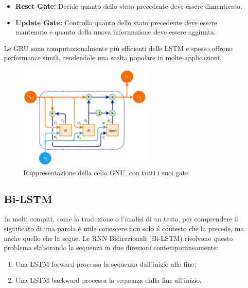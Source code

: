 \begin{itemize}
    \item \textbf{Reset Gate:} Decide quanto dello stato precedente deve essere dimenticato;
    \item \textbf{Update Gate:} Controlla quanto dello stato precedente deve essere mantenuto e quanto della nuova informazione deve essere aggiunta.
\end{itemize}
Le GRU sono computazionalmente più efficienti delle LSTM e spesso offrono performance simili, rendendole una scelta popolare in molte applicazioni.

\begin{figure}[hbtp]
    \centering
    \includegraphics[width=0.60\textwidth]{figure/GNU.png}
    \caption{Rappresentazione della cella GNU, con tutti i suoi gate}
    \label{fig:GNU}
\end{figure}

\subsection{Bi-LSTM}
In molti compiti, come la traduzione o l'analisi di un testo, per comprendere il significato di una parola è utile conoscere non solo il contesto che la precede, ma anche quello che la segue. Le RNN Bidirezionali (Bi-LSTM) risolvono questo problema elaborando la sequenza in due direzioni contemporaneamente:

\begin{enumerate}
    \item Una LSTM forward processa la sequenza dall'inizio alla fine;
    \item Una LSTM backward processa la sequenza dalla fine all'inizio.
\end{enumerate}

